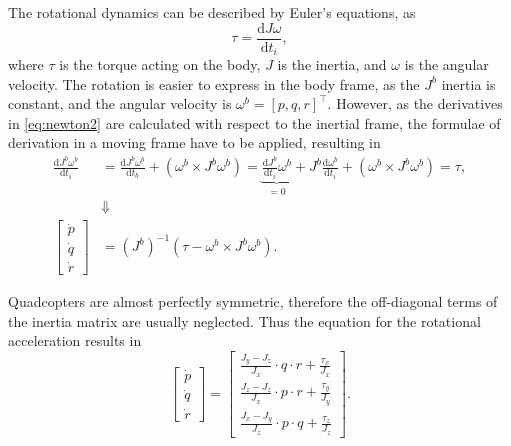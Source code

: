 The rotational dynamics can be described by Euler's equations, as
\begin{equation}\label{eq:newton2}
\tau = \frac{\mathrm{d}J\omega}{\mathrm{d}t_i},
\end{equation}
where $\tau$ is the torque acting on the body, $J$ is the inertia, and $\omega$ is the angular velocity. The rotation is easier to express in the body frame, as the $J^b$ inertia is constant, and the angular velocity is $\omega^b = [p,q,r]^\top$. However, as the derivatives in \eqref{eq:newton2} are calculated with respect to the inertial frame, the formulae of derivation in a moving frame have to be applied, resulting in
\begin{align}
\frac{\mathrm{d}J^b\omega^b}{\mathrm{d}t_i}&= \frac{\mathrm{d}J^b\omega^b}{\mathrm{d}t_b} + \left(\omega^b\times J^b \omega^b\right)=\underbrace{\frac{\mathrm{d}J^b}{\mathrm{d}t_i}\omega^b}_{=0} + J^b \frac{\mathrm{d}\omega^b}{\mathrm{d}t_i} + \left(\omega^b\times J^b \omega^b\right) = \tau,\\
    &\Downarrow \nonumber\\
\begin{bmatrix}
\dot{p} \\ \dot{q} \\ \dot{r} 
\end{bmatrix} &= \left(J^b\right)^{-1}\left(\tau - \omega^b\times J^b \omega^b\right) .\label{eq:rot_dyn}
\end{align}

Quadcopters are almost perfectly symmetric, therefore the off-diagonal terms of the inertia matrix are usually neglected. Thus the equation for the rotational acceleration results in
\begin{equation}\label{eq:rotvel}
\begin{bmatrix}
\dot{p} \\ \dot{q} \\ \dot{r} 
\end{bmatrix} = \begin{bmatrix}
\frac{J_y-J_z}{J_x}\cdot q\cdot r + \frac{\tau_x}{J_x} \\ \frac{J_z-J_z}{J_x}\cdot p\cdot r + \frac{\tau_y}{J_y} \\ \frac{J_x-J_y}{J_z}\cdot p\cdot q  + \frac{\tau_z}{J_z}  
\end{bmatrix}.
\end{equation}


